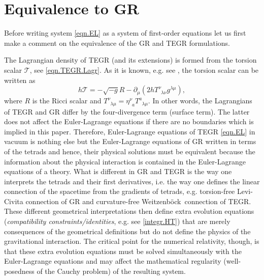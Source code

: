 \documentclass[
10pt, %
a4paper, %
oneside, %
twocolumn,
headinclude,footinclude, %
BCOR5mm, %
]{scrartcl}
\newcommand{\pd}[1]{\partial_{#1}}
\newcommand{\itetrsymbol}{\eta}
\newcommand{\itetr}[2]{\itetrsymbol^{#1}_{\phantom{#1}#2}}
\newcommand{\Tors}[2]{T^{#1}_{\phantom{#1}#2}}
\newcommand{\We}{Weitzenb\"ock}
\newcommand{\Tscal}{\mathcal{T}}		%
\begin{document}
	\section{Equivalence to GR}
	
	Before writing system \eqref{eqn.EL} as a system of first-order equations let us first make a 
	comment on the equivalence of the GR and TEGR formulations. 
	
	The Lagrangian density of TEGR (and its extensions) is formed from the torsion scalar $ \Tscal 
	$, see \eqref{eqn.TEGR.Lagr}. As it is known, e.g. see \cite[Eq.(9.30)]{AldrovandiPereiraBook}, 
	the 
	torsion scalar can be written as
	\begin{equation}\label{eqn.TR}
		h \Tscal = -\sqrt{-g} R - \pd{\mu}(2 h \Tors{\nu}{\lambda\nu}g^{\lambda
			\mu}),
	\end{equation}
	where $ R $ is the Ricci scalar and $ \Tors{\nu}{\lambda\mu} = \itetr{\nu}{a} 
	\Tors{a}{\lambda\mu} 
	$. In other words, the Lagrangians of TEGR and GR differ by the four-divergence term (surface 
	term). The latter does not affect the Euler-Lagrange equations if there are no boundaries which 
	is 
	implied in this paper. 
	Therefore, Euler-Lagrange equations of TEGR \eqref{eqn.EL} in vacuum is nothing else but the 
	Euler-Lagrange 
	equations of GR written in terms of the tetrads and hence, their physical solutions must be 
	equivalent because the information about the physical interaction is contained in the 
	Euler-Lagrange equations of a theory. What is different in GR and TEGR is the 
	way one interprets the tetrads and their first derivatives, i.e. the way one defines the linear 
	connection of the spacetime from the gradients of tetrads, e.g. torsion-free Levi-Civita 
	connection 
	of GR and curvature-free \We\ connection of TEGR. These different geometrical 
	interpretations then define extra evolution equations (\emph{compatibility 
	constraints/identities}, 
	e.g. see \eqref{integr.HT}) 
	that are merely consequences of the geometrical definitions but do not define the physics of 
	the 
	gravitational interaction. %
	The critical point for the numerical relativity, though, is that these extra evolution 
	equations 
	must be solved simultaneously with the Euler-Lagrange equations and may affect the mathematical 
	regularity (well-posedness of the Cauchy problem) of the resulting system. 
	
	
\end{document}
